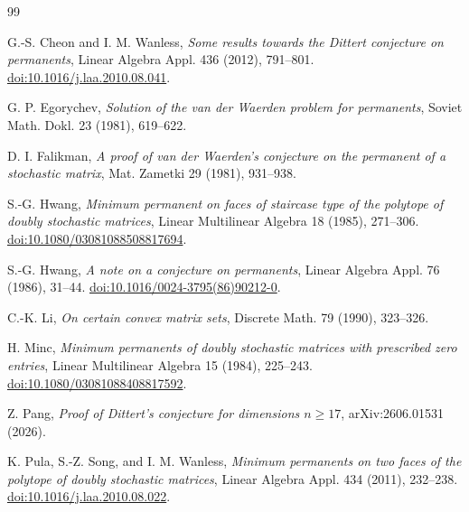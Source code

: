 \documentclass[11pt]{article}
\theoremstyle{remark}
\begin{document}
\begin{thebibliography}{99}

G.-S. Cheon and I. M. Wanless,
\emph{Some results towards the Dittert conjecture on permanents},
Linear Algebra Appl. 436 (2012), 791--801.
\href{https://doi.org/10.1016/j.laa.2010.08.041}{doi:10.1016/j.laa.2010.08.041}.

G. P. Egorychev,
\emph{Solution of the van der Waerden problem for permanents},
Soviet Math. Dokl. 23 (1981), 619--622.

D. I. Falikman,
\emph{A proof of van der Waerden's conjecture on the permanent of a stochastic matrix},
Mat. Zametki 29 (1981), 931--938.

S.-G. Hwang,
\emph{Minimum permanent on faces of staircase type of the polytope of doubly stochastic matrices},
Linear Multilinear Algebra 18 (1985), 271--306.
\href{https://doi.org/10.1080/03081088508817694}{doi:10.1080/03081088508817694}.

S.-G. Hwang,
\emph{A note on a conjecture on permanents},
Linear Algebra Appl. 76 (1986), 31--44.
\href{https://doi.org/10.1016/0024-3795(86)90212-0}{doi:10.1016/0024-3795(86)90212-0}.

C.-K. Li,
\emph{On certain convex matrix sets},
Discrete Math. 79 (1990), 323--326.

H. Minc,
\emph{Minimum permanents of doubly stochastic matrices with prescribed zero entries},
Linear Multilinear Algebra 15 (1984), 225--243.
\href{https://doi.org/10.1080/03081088408817592}{doi:10.1080/03081088408817592}.

Z. Pang,
\emph{Proof of Dittert's conjecture for dimensions $n\ge17$},
arXiv:2606.01531 (2026).

K. Pula, S.-Z. Song, and I. M. Wanless,
\emph{Minimum permanents on two faces of the polytope of doubly stochastic matrices},
Linear Algebra Appl. 434 (2011), 232--238.
\href{https://doi.org/10.1016/j.laa.2010.08.022}{doi:10.1016/j.laa.2010.08.022}.

\end{thebibliography}
\end{document}
